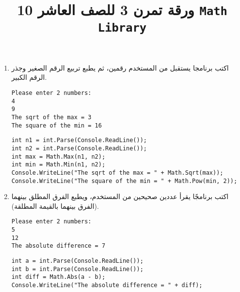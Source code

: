 \documentclass[12pt]{article}
\title{ورقة تمرن 3 للصف العاشر 10 \texttt{Math Library}}
\begin{document}
\maketitle
\thispagestyle{fancy}


\begin{enumerate}[itemsep=3em]

    \item
    اكتب برنامجا يستقبل من المستخدم رقمين، ثم يطبع تربيع الرقم الصغير وجذر الرقم الكبير.
    \ifdetailed
    \begin{example}
    \begin{english}
    \begin{lstlisting}
Please enter 2 numbers:
4
9
The sqrt of the max = 3
The square of the min = 16
    \end{lstlisting}
    \end{english}
    \end{example}
    \ifwithsols
    \begin{solution}
    \begin{english}
    \begin{lstlisting}
int n1 = int.Parse(Console.ReadLine());
int n2 = int.Parse(Console.ReadLine());
int max = Math.Max(n1, n2);
int min = Math.Min(n1, n2);
Console.WriteLine("The sqrt of the max = " + Math.Sqrt(max));
Console.WriteLine("The square of the min = " + Math.Pow(min, 2));
    \end{lstlisting}
    \end{english}
    \end{solution}
    \clearpage
    \fi
\fi

    \item
    اكتب برنامجًا يقرأ عددين صحيحين من المستخدم، ويطبع الفرق المطلق بينهما (الفرق بينهما بالقيمة المطلقة).
    \ifdetailed
    \begin{example}
    \begin{english}
    \begin{lstlisting}
Please enter 2 numbers:
5
12
The absolute difference = 7
    \end{lstlisting}
    \end{english}
    \end{example}
    \ifwithsols
    \begin{solution}
    \begin{english}
    \begin{lstlisting}
int a = int.Parse(Console.ReadLine());
int b = int.Parse(Console.ReadLine());
int diff = Math.Abs(a - b);
Console.WriteLine("The absolute difference = " + diff);
    \end{lstlisting}
    \end{english}
    \end{solution}
    \fi
\fi


\end{enumerate}
\end{document}
